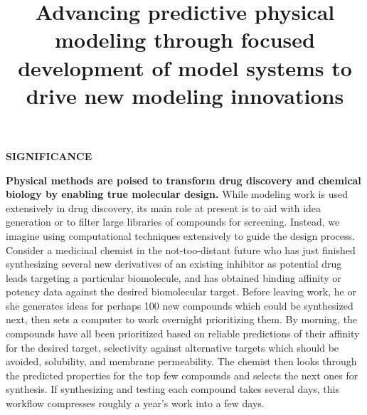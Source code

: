 \documentclass[11pt]{article}
\title{ Advancing predictive physical modeling through focused development of model systems to drive new modeling innovations}
\begin{document}







{\large \bf SIGNIFICANCE}

\textbf{Physical methods are poised to transform drug discovery and chemical biology by enabling true molecular design.}
While modeling work is used extensively in drug discovery, its main role at present is to aid with idea generation or to filter large libraries of compounds for screening. 
Instead, we imagine using computational techniques extensively to guide the design process. 
Consider a medicinal chemist in the not-too-distant future who has just finished synthesizing several new derivatives of an existing inhibitor as potential drug leads targeting a particular biomolecule, and has obtained binding affinity or potency data against the desired biomolecular target. 
Before leaving work, he or she generates ideas for perhaps 100 new compounds which could be synthesized next, then sets a computer to work overnight prioritizing them. 
By morning, the compounds have all been prioritized based on reliable predictions of their affinity for the desired target, selectivity against alternative targets which should be avoided, solubility, and membrane permeability.  
The chemist then looks through the predicted properties for the top few compounds and selects the next ones for synthesis. 
If synthesizing and testing each compound takes several days, this workflow compresses roughly a year's work into a few days.
\end{document}
